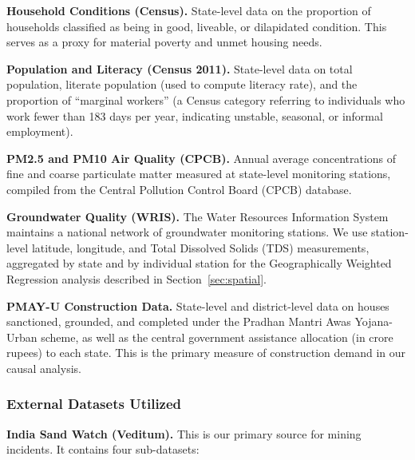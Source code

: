 \documentclass[12pt]{article}
\begin{document}
\textbf{Household Conditions (Census).} State-level data on the proportion of households classified as being in good, liveable, or dilapidated condition. This serves as a proxy for material poverty and unmet housing needs.

\textbf{Population and Literacy (Census 2011).} State-level data on total population, literate population (used to compute literacy rate), and the proportion of ``marginal workers'' (a Census category referring to individuals who work fewer than 183 days per year, indicating unstable, seasonal, or informal employment).

\textbf{PM2.5 and PM10 Air Quality (CPCB).} Annual average concentrations of fine and coarse particulate matter measured at state-level monitoring stations, compiled from the Central Pollution Control Board (CPCB) database.

\textbf{Groundwater Quality (WRIS).} The Water Resources Information System maintains a national network of groundwater monitoring stations. We use station-level latitude, longitude, and Total Dissolved Solids (TDS) measurements, aggregated by state and by individual station for the Geographically Weighted Regression analysis described in Section~\ref{sec:spatial}.

\textbf{PMAY-U Construction Data.} State-level and district-level data on houses sanctioned, grounded, and completed under the Pradhan Mantri Awas Yojana-Urban scheme, as well as the central government assistance allocation (in crore rupees) to each state. This is the primary measure of construction demand in our causal analysis.

\subsubsection{External Datasets Utilized}

\textbf{India Sand Watch (Veditum).} This is our primary source for mining incidents. It contains four sub-datasets:
\end{document}
